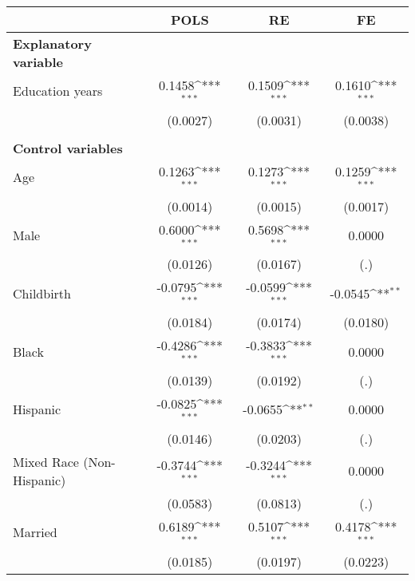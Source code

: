 {
\def\sym#1{\ifmmode^{#1}\else\(^{#1}\)\fi}
\begin{tabular}{l*{3}{c}}
\toprule
                    &\multicolumn{1}{c}{POLS}&\multicolumn{1}{c}{RE}&\multicolumn{1}{c}{FE}\\
\midrule
\textbf{Explanatory variable}&                     &                     &                     \\
Education years     &      0.1458\sym{***}&      0.1509\sym{***}&      0.1610\sym{***}\\
                    &    (0.0027)         &    (0.0031)         &    (0.0038)         \\
\\ \textbf{Control variables}&                     &                     &                     \\
Age                 &      0.1263\sym{***}&      0.1273\sym{***}&      0.1259\sym{***}\\
                    &    (0.0014)         &    (0.0015)         &    (0.0017)         \\
Male                &      0.6000\sym{***}&      0.5698\sym{***}&      0.0000         \\
                    &    (0.0126)         &    (0.0167)         &         (.)         \\
Childbirth          &     -0.0795\sym{***}&     -0.0599\sym{***}&     -0.0545\sym{**} \\
                    &    (0.0184)         &    (0.0174)         &    (0.0180)         \\
Black               &     -0.4286\sym{***}&     -0.3833\sym{***}&      0.0000         \\
                    &    (0.0139)         &    (0.0192)         &         (.)         \\
Hispanic            &     -0.0825\sym{***}&     -0.0655\sym{**} &      0.0000         \\
                    &    (0.0146)         &    (0.0203)         &         (.)         \\
Mixed Race (Non-Hispanic)&     -0.3744\sym{***}&     -0.3244\sym{***}&      0.0000         \\
                    &    (0.0583)         &    (0.0813)         &         (.)         \\
Married             &      0.6189\sym{***}&      0.5107\sym{***}&      0.4178\sym{***}\\
                    &    (0.0185)         &    (0.0197)         &    (0.0223)         \\

\end{tabular}}
